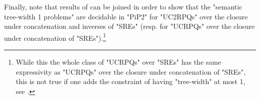 \begin{remark}
	Finally, note that results of  can be joined in order to show that the "semantic tree-width 1 problems" are decidable in "PiP2" for "UC2RPQs" over the closure
	under concatenation and inverses of "SREs"  (resp. for "UCRPQs" over the closure under concatenation of "SREs").\footnote{While this the whole class of "UCRPQs" over "SREs" has the same expressivity as "UCRPQs" over the closure under concatenation of "SREs", this is not true if one adds the constraint of having "tree-width" at most 1, see .}
\end{remark}
